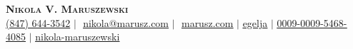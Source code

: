 \begin{center}
  \textbf{\Huge \scshape Nikola V. Maruszewski} \\
  \vspace{3pt}%
  \small%
  \faPhone* \href{tel:(847) 644-3542}{(847) 644-3542}
  $|$ \faEnvelope\,\,\href{mailto:nikola@marusz.com}{\underline{nikola@marusz.com}}
  $|$ \faGlobe\,\,\href{https://marusz.com}{\underline{marusz.com}}
  $|$  \href{https://github.com/egelja}{\underline{egelja}}
  $|$  \href{https://orcid.org/0009-0009-5468-4085}{\underline{0009-0009-5468-4085}}
  $|$  \href{https://www.linkedin.com/in/nikola-maruszewski/}{\underline{nikola-maruszewski}}
\end{center}
